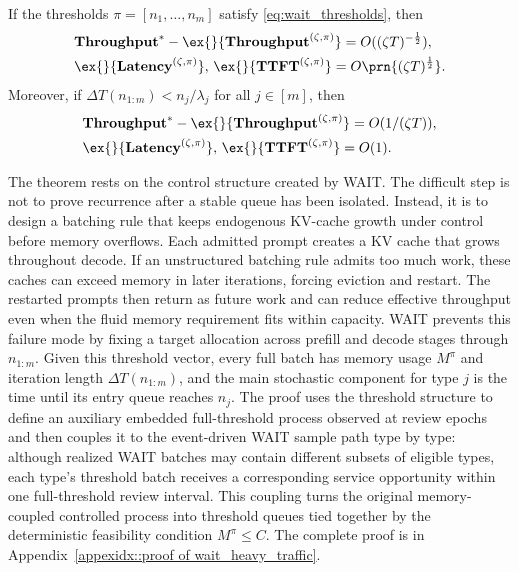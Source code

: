 \begin{theorem}
\label{thm:wait_heavy_traffic}
If the thresholds \(\pi=[n_1,\dots,n_m]\) satisfy \eqref{eq:wait_thresholds}, then
\[
\begin{aligned}
&\throughput^*-\ex{}{\throughput^{(\zeta,\pi)}}=O((\zeta T)^{-\frac{1}{2}}),\\
&\ex{}{\Latency^{(\zeta,\pi)}},\,\ex{}{\TTFT^{(\zeta,\pi)}}=O\prn{(\zeta T)^{\frac{1}{2}}}.
\end{aligned}
\]
Moreover, if \(\Delta T(n_{1:m})<n_j/\lambda_j\) for all \(j\in[m]\), then
\[
\begin{aligned}
&\throughput^* - \ex{}{\throughput^{(\zeta,\pi)}} = O(1/(\zeta T)), \\
&\ex{}{\Latency^{(\zeta,\pi)}},\, \ex{}{\TTFT^{(\zeta,\pi)}} = O(1).
\end{aligned}
\]
\end{theorem}

The theorem rests on the control structure created by WAIT. The difficult step is not to prove recurrence after a stable queue has been isolated. Instead, it is to design a batching rule that keeps endogenous KV-cache growth under control before memory overflows. Each admitted prompt creates a KV cache that grows throughout decode. If an unstructured batching rule admits too much work, these caches can exceed memory in later iterations, forcing eviction and restart. The restarted prompts then return as future work and can reduce effective throughput even when the fluid memory requirement fits within capacity. WAIT prevents this failure mode by fixing a target allocation across prefill and decode stages through \(n_{1:m}\). Given this threshold vector, every full batch has memory usage \(M^\pi\) and iteration length \(\Delta T(n_{1:m})\), and the main stochastic component for type \(j\) is the time until its entry queue reaches \(n_j\). The proof uses the threshold structure to define an auxiliary embedded full-threshold process observed at review epochs and then couples it to the event-driven WAIT sample path type by type: although realized WAIT batches may contain different subsets of eligible types, each type's threshold batch receives a corresponding service opportunity within one full-threshold review interval. This coupling turns the original memory-coupled controlled process into threshold queues tied together by the deterministic feasibility condition \(M^\pi\le C\). The complete proof is in Appendix~\ref{appexidx::proof of wait_heavy_traffic}.

